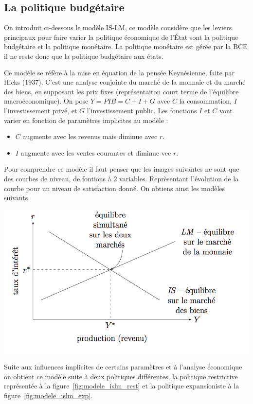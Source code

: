 \subsection{La politique budgétaire} %
\label{sub:la_politique_budgetaire}
On introduit ci-dessous le modèle IS-LM, ce modèle considère que les leviers principaux pour faire varier la politique économique de l'État sont la politique 
budgétaire et la politique monétaire. La politique monétaire est gérée par la BCE il ne reste donc que la politique budgétaire aux états.

\begin{tcolorbox}[title= Modèle IS-LM] 
	Ce modèle se réfère à la mise en équation de la pensée Keynésienne, faite par Hicks (1937). C'est une analyse conjointe du marché de la monnaie et du marché des biens, en supposant les prix fixes (représentaiton court terme de l'équilibre macroéconomique). 
  On pose $Y=PIB=C+I+G$ avec $C$ la consommation, $I$ l'investissement privé, et $G$ l'investissement public. Les fonctions $I$ et $C$ vont varier en fonction de paramètres implicites au modèle :
	\begin{itemize}[label=]
		\item $C$ augmente avec les revenus mais diminue avec $r$.
		\item $I$ augmente avec les ventes courantes et diminue vec $r$.
	\end{itemize}
Pour comprendre ce modèle il faut penser que les images suivantes ne sont que des courbes de niveau, de fontions à 2 variables. Reprèsentant l'évolution 
de la courbe pour un niveau de satisfaction donné. On obtiens ainsi les modèles suivants. 

	\begin{center}
		\includegraphics[scale=0.5]{./img/im4}
	\end{center}
  \label{fig:modele_islm}

Suite aux influences implicites de certains paramètres et à l'analyse économique
on obtient ce modèle suite à deux politiques différentes,
la politique restrictive représentée à la figure~\ref{fig:modele_islm_rest}
et la politique expansioniste à la figure~\ref{fig:modele_islm_exp}.
\end{tcolorbox}

